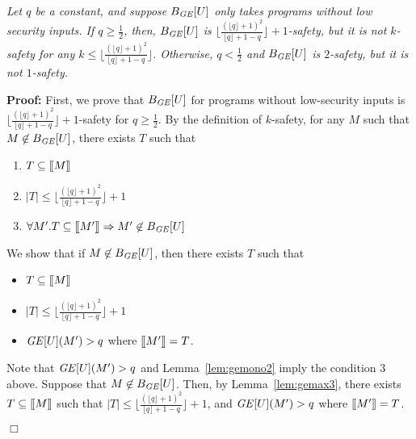 \documentclass{llncs}
\newenvironment{proof}{\noindent\rm{\bf Proof:}}{\hbox{$\Box$}\vspace*{0.2\baselineskip}}
\newenvironment{reftheorem}[1]{\begin{trivlist}\item[\hskip
      \labelsep{\bf Theorem #1.}]\it}{\end{trivlist}}
\newcommand{\sembrack}[1]{[\hspace*{-1.2pt}[#1]\hspace*{-1.2pt}]}
\begin{document}
\begin{reftheorem}{\ref{thm:gek}}
  Let $q$ be a constant, and suppose $B_{\it GE}[U]$ only takes
  programs without low security inputs.  If $q\ge\frac{1}{2}$, then,
  $B_{\it GE}[U]$ is $\lfloor\frac{(\lfloor q\rfloor +1)^2}{\lfloor
    q\rfloor +1 -q} \rfloor +1$-safety, but it is not $k$-safety for
  any $k \leq \lfloor\frac{(\lfloor q\rfloor +1)^2}{\lfloor q\rfloor
    +1 -q} \rfloor$.  Otherwise, $q<\frac{1}{2}$ and $B_{\it GE}[U]$
  is $2$-safety, but it is not $1$-safety.
\end{reftheorem}
\begin{proof}
  First, we prove that $B_{\it GE}[U]$ for programs without
  low-security inputs is $\lfloor\frac{(\lfloor q\rfloor
    +1)^2}{\lfloor q\rfloor +1 -q} \rfloor +1$-safety for $q \geq
  \frac{1}{2}$.  By the definition of $k$-safety, for any $M$ such
  that $M\not\in B_{\it GE}[U]$, there exists $T$ such that
\begin{enumerate}
\item $T\subseteq \sembrack{M}$
\item $|T|\le \lfloor\frac{(\lfloor q\rfloor +1)^2}{\lfloor q\rfloor
    +1 -q} \rfloor +1$
\item $\forall M'.T\subseteq\sembrack{M'}\Rightarrow M'\not\in B_{\it
    GE}[U]$
\end{enumerate}
We show that if $M\not\in B_{\it GE}[U]$, then there exists $T$ such
that
\begin{itemize}
\item $T\subseteq \sembrack{M}$
\item $|T|\le \lfloor\frac{(\lfloor q\rfloor +1)^2}{\lfloor q\rfloor
    +1 -q} \rfloor +1$
\item ${\it GE}[U](M')>q$ where $\sembrack{M'}=T$.
\end{itemize}
Note that ${\it GE}[U](M')>q$ and Lemma~\ref{lem:gemono2} imply the
condition 3 above.  Suppose that $M\not\in B_{\it GE}[U]$.  Then, by
Lemma~\ref{lem:gemax3}, there exists $T\subseteq\sembrack{M}$ such
that $|T|\le \lfloor\frac{(\lfloor q\rfloor +1)^2}{\lfloor q\rfloor +1
-q} \rfloor +1$, and ${\it GE}[U](M')>q$ where $\sembrack{M'}=T$.


\end{proof}
\end{document}
